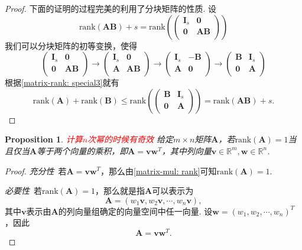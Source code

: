 \documentclass{article}
\newtheorem{proposition}[theorem]{Proposition}
\newcommand{\mbf}[1]{\bm{#1}}
\newcommand{\rank}[1]{\text{rank}\left(#1\right)} %
\newcommand{\redt}[1]{\textcolor{red}{#1}}
\begin{document}
\begin{proof}
\rm 下面的证明的过程完美的利用了分块矩阵的性质. 设
$$
\rank{\mbf{A}\mbf{B}} + s = \rank{\begin{pmatrix}
\mbf{I}_s & \mbf{0} \\
\mbf{0} & \mbf{AB} \\
\end{pmatrix}}
$$
我们可以分块矩阵的初等变换，使得
$$
\begin{pmatrix}
\mbf{I}_s & \mbf{0} \\
\mbf{0} & \mbf{AB} \\
\end{pmatrix} \to \begin{pmatrix}
\mbf{I}_s & \mbf{0} \\
\mbf{A} & \mbf{AB} \\
\end{pmatrix} \to 
\begin{pmatrix}
\mbf{I}_s & \mbf{-B} \\
\mbf{A} & \mbf{0} \\
\end{pmatrix} \to 
\begin{pmatrix}
\mbf{B} & \mbf{I}_s \\
\mbf{0} & \mbf{A} \\
\end{pmatrix}
$$
根据\ref{matrix-rank: special3}就有
$$
\rank{\mbf{A}} + \rank{\mbf{B}}  \leq \rank{\begin{pmatrix}
\mbf{B} & \mbf{I}_s \\
\mbf{0} & \mbf{A} \\
\end{pmatrix}} = \rank{\mbf{AB}} + s.
$$
\end{proof}

\begin{proposition}
\rm \redt{计算$n$次幂的时候有奇效} 给定$m \times n$矩阵$\mbf{A}$，若$\rank{\mbf{A}}=1$当且仅当$\mbf{A}$等于两个向量的乘积，即$\mbf{A} = \mbf{v}\mbf{w}^T$，其中列向量$\mbf{v} \in \mathbb{R}^{m},\mbf{w} \in \mathbb{R}^n$.  
\end{proposition}

\begin{proof}
\emph{充分性}\ 若$\mbf{A}=\mbf{v}\mbf{w}^T$，那么由\ref{matrix-mul: rank}可知$\rank{\mbf{A}} = 1$. 

\emph{必要性}\ 若$\rank{\mbf{A}}=1$，那么就是指$\mbf{A}$可以表示为
$$
\mbf{A} = (w_1 \mbf{v},w_2 \mbf{v},\cdots, w_n \mbf{v}),
$$
其中$\mbf{v}$表示由$\mbf{A}$的列向量组确定的向量空间中任一向量. 设$\mbf{w} = (w_1,w_2,\cdots,w_n)^T$，因此
$$
\mbf{A} = \mbf{v}\mbf{w}^T.
$$
\end{proof}
\end{document}
